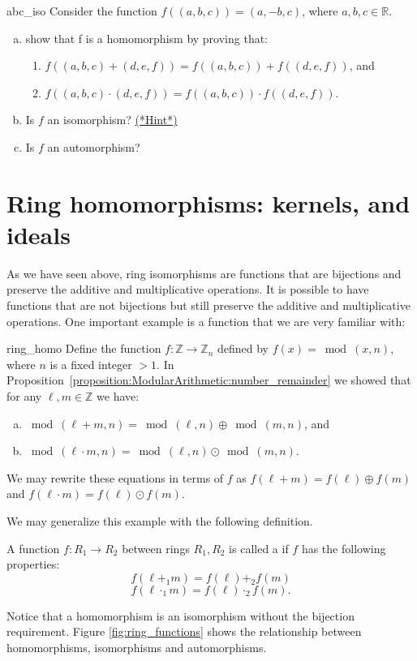 \begin{exercise}{abc_iso}
Consider the function $f((a,b,c))=(a,-b,c)$, where $a,b,c\in{\mathbb R}$.
\begin{enumerate}[(a)]
\item show that f is a homomorphism by proving that:
\begin{enumerate}[(1)]
\item $f((a,b,c)+(d,e,f))=f((a,b,c))+f((d,e,f))$, and 
\item $f((a,b,c)\cdot(d,e,f))=f((a,b,c))\cdot f((d,e,f))$.
\end{enumerate}
\item Is $f$ an isomorphism? \hyperref[ringsHints]{(*Hint*)} 
\item Is $f$ an automorphism?
\end{enumerate}
\end{exercise}

\section{Ring homomorphisms: kernels, and ideals}
\label{sec:Rings:RingHomomorphismKernelsIdeals}

As we have seen above, ring isomorphisms are functions that are bijections and preserve the additive and multiplicative operations. It is possible to have functions that are not bijections but still preserve the additive and multiplicative operations.  One important example is a function that we are very familiar with: 

\begin{example}{ring_homo}
Define the function $f:{\mathbb Z}\rightarrow {\mathbb Z}_n$ defined by $f(x)=\bmod(x,n)$, where $n$ is a fixed integer $> 1$.  In Proposition~\ref{proposition:ModularArithmetic:number_remainder} we showed that for any $\ell,m \in {\mathbb Z}$ we have:
\begin{enumerate}[(a)]
\item
$\bmod(\ell+ m,n) = \bmod(\ell,n) \oplus \bmod(m,n)$, 
and
\item
$\bmod(\ell \cdot m,n) = \bmod(\ell,n) \odot \bmod(m,n)$.
\end{enumerate}
We may rewrite these equations in terms of $f$ as $f(\ell+ m) = f(\ell) \oplus f(m)$ and $f(\ell\cdot m) = f(\ell) \odot f(m)$. 
\end{example}
We may generalize this example with the following definition.

\begin{defn}\label{homomorph}
A function $f:R_1\rightarrow R_2$ between rings $R_1,R_2$ is called a  if $f$ has the following properties:
\begin{equation}\label{eq:homo_add}
f(\ell+_1 m) = f(\ell) +_2 f(m)
\end{equation} 
\begin{equation}\label{eq:homo_mult}
f(\ell\cdot_1 m) = f(\ell) \cdot_2 f(m).
\end{equation}
\end{defn}
Notice that a homomorphism is an isomorphism without the bijection requirement.  Figure \ref{fig:ring_functions} shows the relationship between homomorphisms, isomorphisms and automorphisms.

